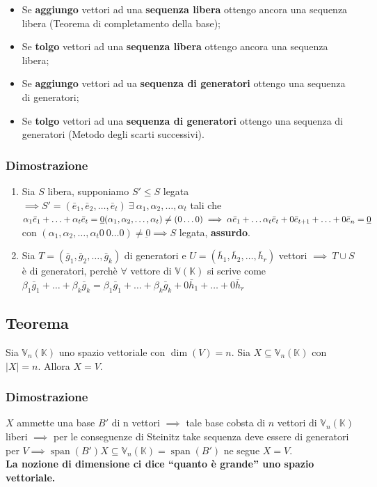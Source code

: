\documentclass{article}
\DeclareMathOperator{\Span}{span}
\newcommand{\V}{\mathbb{V} (\mathbb{K})}
\newcommand{\s}[2]{#1_1, #1_2, \ldots, #1_{#2}}
\newcommand{\Vx}[1]{\mathbb{V}_#1 (\mathbb{K})}
\newcommand{\ah}{\alpha}
\newcommand{\bh}{\beta}
\begin{document}
\begin{itemize}
    \item Se \textbf{aggiungo} vettori ad una \textbf{sequenza libera} ottengo ancora una sequenza libera (Teorema di completamento della base);
    \item Se \textbf{tolgo} vettori ad una \textbf{sequenza libera} ottengo ancora una sequenza libera;
    \item Se \textbf{aggiungo} vettori ad ua \textbf{sequenza di generatori} ottengo una sequenza di generatori;
    \item Se \textbf{tolgo} vettori ad una \textbf{sequenza di generatori} ottengo una sequenza di generatori (Metodo degli scarti successivi).
\end{itemize}

\subsubsection{Dimostrazione}
\begin{enumerate}
    \item Sia $S$ libera, supponiamo $S'\leq S$ legata $\implies S'=(\s{\bar e}{t})\ \exists\ \s{\ah}{t}$ tali che $\ah_1\bar e_1+\ldots+\ah_t\bar e_t=\underbar{0} \\
              (\s{\ah}{t}) \ne (0\ldots0) \implies \ah\bar e_1+\ldots\ah_t\bar e_t+0\bar e_{t+1}+\ldots+0\bar e_n = \underbar{0}$ con $(\s{\ah}{t}0 \ 0 \ldots0)\ne\underbar{0} \implies S$ legata, \textbf{assurdo}.
    \item Sia $T= (\s{\bar g}{k})$ di generatori e $U=(\s{\bar h}{r})$ vettori $\implies \ T \cup S$ è di generatori, perchè $\forall$ vettore di $\V$ si scrive come $\bh_1\bar g_1+\ldots+\bh_k\bar g_k = \bh_1 \bar g_1+\ldots+\bh_k \bar g_k + 0\bar h_1+\ldots+0\bar h_r$
\end{enumerate}

\subsection{Teorema}
Sia $\Vx{n}$ uno spazio vettoriale con $\dim(V) = n$. Sia $X\subseteq\Vx{n}$ con $|X| = n$. Allora $X = V$.

\subsubsection{Dimostrazione}
$X$ ammette una base $B'$ di n vettori $\implies$ tale base cobsta di $n$ vettori di $\Vx{n}$ liberi $\implies$ per le conseguenze di Steinitz take sequenza deve essere di generatori per $V\implies\Span(B') X\subseteq\Vx{n}=\Span(B')$ ne segue $X = V$.\\
\textbf{La nozione di dimensione ci dice ``quanto è grande'' uno spazio vettoriale.}
\end{document}
